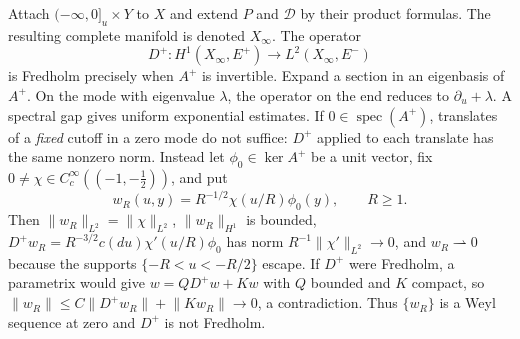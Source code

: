\documentclass[12pt,oneside,reqno]{article}
\theoremstyle{plain}
\theoremstyle{definition}
\theoremstyle{remark}
\begin{document}
Attach $(-\infty,0]_u\times Y$ to $X$ and extend \(P\) and
\(\mathcal D\) by their product formulas. The resulting complete manifold
is denoted $X_\infty$. The
operator
\[
 D^+:
 H^1(X_\infty,E^+)
 \longrightarrow
 L^2(X_\infty,E^-)
\]
is Fredholm precisely when $A^+$ is invertible. Expand a section in an
eigenbasis of \(A^+\). On the mode with eigenvalue \(\lambda\), the operator
on the end reduces to \(\partial_u+\lambda\). A spectral gap gives uniform
exponential estimates.
If \(0\in\operatorname{spec}(A^+)\), translates of a \emph{fixed} cutoff
in a zero mode do not suffice: \(D^+\) applied to each translate has the
same nonzero norm. Instead let \(\phi_0\in\ker A^+\) be a unit
vector, fix \(0\neq\chi\in C_c^\infty((-1,-\tfrac12))\), and put
\[
 w_R(u,y)=R^{-1/2}\chi(u/R)\phi_0(y),\qquad R\geq1 .
\]
Then \(\lVert w_R\rVert_{L^2}=\lVert\chi\rVert_{L^2}\),
\(\lVert w_R\rVert_{H^1}\) is bounded,
\(D^+w_R=R^{-3/2}c(du)\chi'(u/R)\phi_0\) has norm
\(R^{-1}\lVert\chi'\rVert_{L^2}\to0\), and \(w_R\rightharpoonup0\)
because the supports \(\{-R<u<-R/2\}\) escape. If \(D^+\) were Fredholm,
a parametrix would give \(w=QD^+w+Kw\) with \(Q\) bounded and \(K\)
compact, so \(\lVert w_R\rVert\leq C\lVert D^+w_R\rVert+\lVert Kw_R\rVert\to0\),
a contradiction. Thus \(\{w_R\}\) is a Weyl sequence at zero and
\(D^+\) is not Fredholm.
\end{document}
